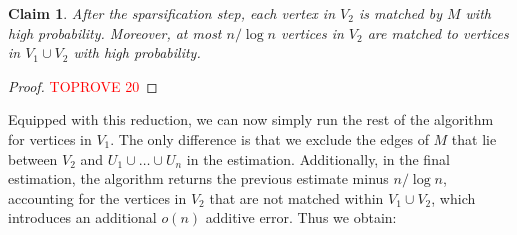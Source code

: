 \documentclass[letterpaper,11pt]{article}
\newtheorem{claim}[lemma]{Claim}
\begin{document}
\begin{claim}
    After the sparsification step, each vertex in $V_2$ is matched by $M$ with high probability. Moreover, at most $n/\log n$ vertices in $V_2$ are matched to vertices in $V_1 \cup V_2$ with high probability.
\end{claim}
\begin{proof}\textcolor{red}{TOPROVE 20}\end{proof}


Equipped with this reduction, we can now simply run the rest of the algorithm for vertices in $V_1$. The only difference is that we exclude the edges of $M$ that lie between $V_2$ and $U_1 \cup \ldots \cup U_n$ in the estimation. Additionally, in the final estimation, the algorithm returns the previous estimate minus $n/\log n$, accounting for the vertices in $V_2$ that are not matched within $V_1 \cup V_2$, which introduces an additional $o(n)$ additive error.
Thus we obtain:


\maintheoremAdjmat* 


\end{document}
